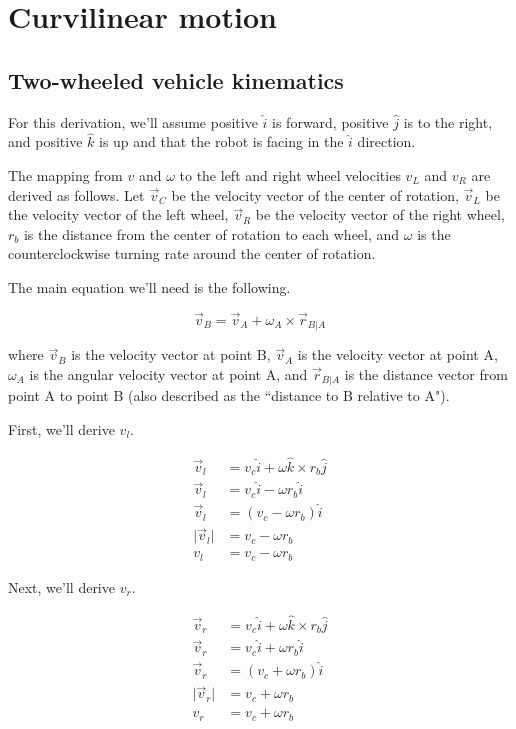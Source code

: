 \section{Curvilinear motion}

\subsection{Two-wheeled vehicle kinematics}

For this derivation, we'll assume positive $\hat{i}$ is forward, positive
$\hat{j}$ is to the right, and positive $\hat{k}$ is up and that the robot is
facing in the $\hat{i}$ direction.

The mapping from $v$ and $\omega$ to the left and right wheel velocities $v_L$
and $v_R$ are derived as follows. Let $\vec{v}_C$ be the velocity vector of the
center of rotation, $\vec{v}_L$ be the velocity vector of the left wheel,
$\vec{v}_R$ be the velocity vector of the right wheel, $r_b$ is the distance
from the center of rotation to each wheel, and $\omega$ is the counterclockwise
turning rate around the center of rotation.

The main equation we'll need is the following.

\begin{equation*}
  \vec{v}_B = \vec{v}_A + \omega_A \times \vec{r}_{B|A}
\end{equation*}

where $\vec{v}_B$ is the velocity vector at point B, $\vec{v}_A$ is the velocity
vector at point A, $\omega_A$ is the angular velocity vector at point A, and
$\vec{r}_{B|A}$ is the distance vector from point A to point B (also described
as the ``distance to B relative to A").

First, we'll derive $v_l$.

\begin{align}
  \vec{v}_l &= v_c \hat{i} + \omega \hat{k} \times r_b \hat{j} \nonumber \\
  \vec{v}_l &= v_c \hat{i} - \omega r_b \hat{i} \nonumber \\
  \vec{v}_l &= (v_c - \omega r_b) \hat{i} \nonumber \\
  \lvert\vec{v}_l\rvert &= v_c - \omega r_b \nonumber \\
  v_l &= v_c - \omega r_b \label{eq:diff_vl}
\end{align}

Next, we'll derive $v_r$.

\begin{align}
  \vec{v}_r &= v_c \hat{i} + \omega \hat{k} \times r_b \hat{j} \nonumber
    \\
  \vec{v}_r &= v_c \hat{i} + \omega r_b \hat{i} \nonumber \\
  \vec{v}_r &= (v_c + \omega r_b) \hat{i} \nonumber \\
  \lvert\vec{v}_r\rvert &= v_c + \omega r_b \nonumber \\
  v_r &= v_c + \omega r_b \label{eq:diff_vr}
\end{align}
